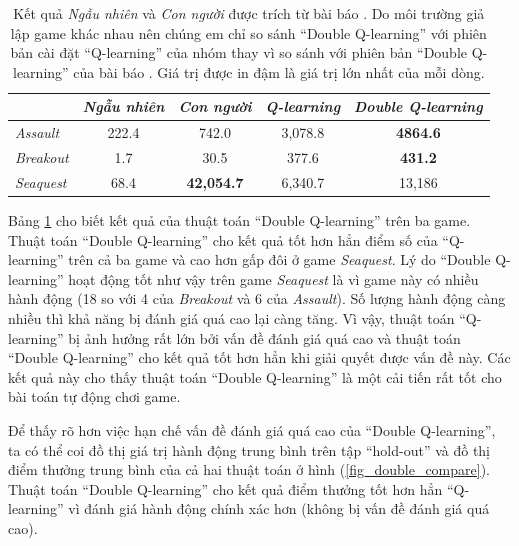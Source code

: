 	\begin{table}
		\centering
		\caption[Điểm thưởng nhận được của thuật toán ``Double Q-learning'']{
		Kết quả \textit{Ngẫu nhiên} và \textit{Con người} được trích từ bài báo \cite{van2015deep}.
		Do môi trường giả lập game khác nhau nên chúng em chỉ so sánh ``Double Q-learning'' với phiên bản cài đặt ``Q-learning'' của nhóm thay vì so sánh với phiên bản ``Double Q-learning'' của bài báo \cite{van2015deep}.
		Giá trị được in đậm là giá trị lớn nhất của mỗi dòng.}
		\label{table_double_results}
		\begin{tabular}{| l | c | c | c | c |}
			\hline
			 & \textit{Ngẫu nhiên}\cite{mnihdqn2015} & \textit{Con người}\cite{mnihdqn2015} & \textit{Q-learning} & \textit{Double Q-learning} \\
			\hline \hline
			\textit{Assault} & 222.4 & 742.0 & 3,078.8 & \textbf{4864.6} \\
			\hline
			\textit{Breakout} & 1.7 & 30.5 & 377.6 & \textbf{431.2} \\
			\hline
			\textit{Seaquest} & 68.4 & \textbf{42,054.7} & 6,340.7 & 13,186 \\
			\hline
		\end{tabular}		
	\end{table}
	
	Bảng \ref{table_double_results} cho biết kết quả của thuật toán ``Double Q-learning'' trên ba game.
	Thuật toán ``Double Q-learning'' cho kết quả tốt hơn hẳn điểm số của ``Q-learning'' trên cả ba game và cao hơn gấp đôi ở game \textit{Seaquest}.
	Lý do ``Double Q-learning'' hoạt động tốt như vậy trên game \textit{Seaquest} là vì game này có nhiều hành động (18 so với 4 của \textit{Breakout} và 6 của \textit{Assault}).
	Số lượng hành động càng nhiều thì khả năng bị đánh giá quá cao lại càng tăng.
	Vì vậy, thuật toán ``Q-learning'' bị ảnh hưởng rất lớn bởi vấn đề đánh giá quá cao và thuật toán ``Double Q-learning'' cho kết quả tốt hơn hẳn khi giải quyết được vấn đề này.
	Các kết quả này cho thấy thuật toán ``Double Q-learning'' là một cải tiến rất tốt cho bài toán tự động chơi game.
	
	Để thấy rõ hơn việc hạn chế vấn đề đánh giá quá cao của ``Double Q-learning'', ta có thể coi đồ thị giá trị hành động trung bình trên tập ``hold-out'' và đồ thị điểm thưởng trung bình của cả hai thuật toán ở hình (\ref{fig_double_compare}).
	Thuật toán ``Double Q-learning'' cho kết quả điểm thưởng tốt hơn hẳn ``Q-learning'' vì đánh giá hành động chính xác hơn (không bị vấn đề đánh giá quá cao).
	
